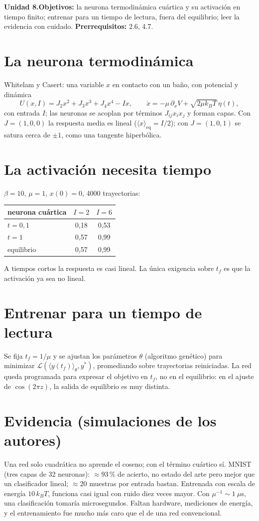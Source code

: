 \documentclass[11pt,a4paper]{article}
\begin{document}

\noindent\textbf{Unidad 8.}\quad\textbf{Objetivos:} la neurona termodinámica cuártica y su activación en tiempo finito; entrenar para un tiempo de lectura,
fuera del equilibrio; leer la evidencia con cuidado.
\textbf{Prerrequisitos:} 2.6, 4.7.

\section{La neurona termodinámica}
Whitelam y Casert: una variable $x$ en contacto con un baño, con potencial y dinámica
\[U(x,I)=J_2x^2+J_3x^3+J_4x^4-Ix,\qquad\dot x=-\mu\,\partial_xV+\sqrt{2\mu k_BT}\,\eta(t),\]
con entrada $I$; las neuronas se acoplan por términos $J_{ij}x_ix_j$ y forman capas. Con $J=(1,0,0)$ la respuesta media es lineal ($\langle x\rangle_{\text{eq}}=I/2$);
con $J=(1,0,1)$ se satura cerca de $\pm1$, como una tangente hiperbólica.

\section{La activación necesita tiempo \evS}
$\beta=10$, $\mu=1$, $x(0)=0$, 4000 trayectorias:
\begin{center}\begin{tabular}{lcc}\toprule
neurona cuártica & $I=2$ & $I=6$\\\midrule
$t=0{,}1$ & 0,18 & 0,53\\
$t=1$ & 0,57 & 0,99\\
equilibrio & 0,57 & 0,99\\\bottomrule\end{tabular}\end{center}
A tiempos cortos la respuesta es casi lineal. La única exigencia sobre $t_f$ es que la activación ya sea no lineal.

\section{Entrenar para un tiempo de lectura}
Se fija $t_f=1/\mu$ y se ajustan los parámetros $\theta$ (algoritmo genético) para minimizar $\mathcal L(\langle y(t_f)\rangle_\theta,y^\ast)$, promediando sobre trayectorias
reiniciadas. La red queda programada para expresar el objetivo en $t_f$, no en el equilibrio: en el ajuste de $\cos(2\pi z)$, la salida de equilibrio es muy distinta.

\section{Evidencia (simulaciones de los autores)}
Una red solo cuadrática no aprende el coseno; con el término cuártico sí. MNIST (tres capas de 32 neuronas): $\approx93\,\%$ de acierto, no estado del arte pero mejor
que un clasificador lineal; $\approx20$ muestras por entrada bastan. Entrenada con escala de energía $10\,k_BT$, funciona casi igual con ruido diez veces mayor.
Con $\mu^{-1}\sim1\ \mu$s, una clasificación tomaría microsegundos. Faltan hardware, mediciones de energía, y el entrenamiento fue mucho más caro que el de una red
convencional.
\end{document}
